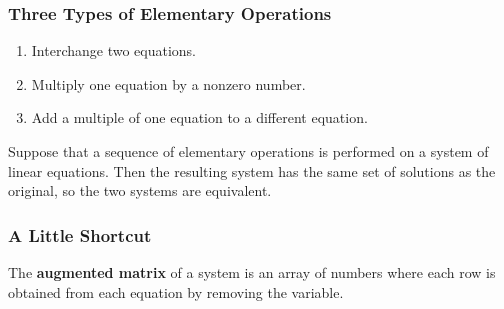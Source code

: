 \documentclass[20pt,a4paper]{extarticle}
\newcounter{example}[section]
\newcounter{theorem}
\newcounter{definition}
\begin{document}
\begin{example}
\end{example}


\newpage 

\subsubsection*{Three Types of Elementary Operations}

\begin{enumerate}[label=\textbf{\Roman*.}]
\item Interchange two equations.
\item Multiply one equation by a nonzero number.
\item Add a multiple of one equation to a different equation.
\end{enumerate}

\begin{theorem}
Suppose that a sequence of elementary operations is performed on a system of linear equations. Then the resulting system has the same set of solutions as the original, so the two systems are equivalent.
\end{theorem}

\subsubsection*{A Little Shortcut}

\begin{definition}
The \textbf{augmented matrix} of a system is an array of numbers where each row is obtained from each equation by removing the variable.
\end{definition}
\end{document}
